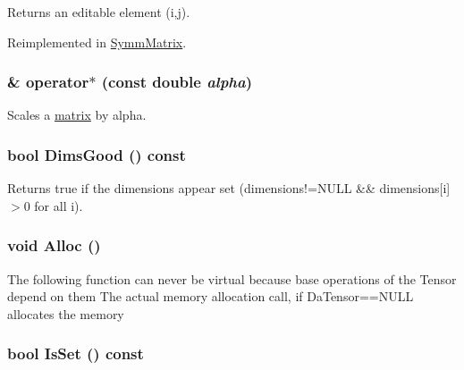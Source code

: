 Returns an editable element (i,j). 

Reimplemented in \hyperlink{classJKBuilder_1_1SymmMatrix_a3d7fca183ff1c9f4c160218746f2ef31}{SymmMatrix}.\hypertarget{classJKBuilder_1_1matrix_ad4799cbe4a5d07c77f41857a3ce914a2}{
\subsubsection[{operator$\ast$}]{ \& operator$\ast$ (const double {\em alpha})}}
\label{classJKBuilder_1_1matrix_ad4799cbe4a5d07c77f41857a3ce914a2}


Scales a \hyperlink{classJKBuilder_1_1matrix}{matrix} by alpha. \hypertarget{classJKBuilder_1_1tensor_a6e72344440b411f433eb50171648c2d0}{
\subsubsection[{DimsGood}]{\setlength{\rightskip}{0pt plus 5cm}bool DimsGood () const}}
\label{classJKBuilder_1_1tensor_a6e72344440b411f433eb50171648c2d0}


Returns true if the dimensions appear set (dimensions!=NULL \&\& dimensions\mbox{[}i\mbox{]}$>$0 for all i). \hypertarget{classJKBuilder_1_1tensor_a0ca5cbe96d2a61f06ae4b543ef84f166}{
\subsubsection[{Alloc}]{\setlength{\rightskip}{0pt plus 5cm}void Alloc ()}}
\label{classJKBuilder_1_1tensor_a0ca5cbe96d2a61f06ae4b543ef84f166}
The following function can never be virtual because base operations of the Tensor depend on them The actual memory allocation call, if DaTensor==NULL allocates the memory \hypertarget{classJKBuilder_1_1tensor_a79c9a36acc5dbeab94033ca97971dc09}{
\subsubsection[{IsSet}]{\setlength{\rightskip}{0pt plus 5cm}bool IsSet () const}}
\label{classJKBuilder_1_1tensor_a79c9a36acc5dbeab94033ca97971dc09}


